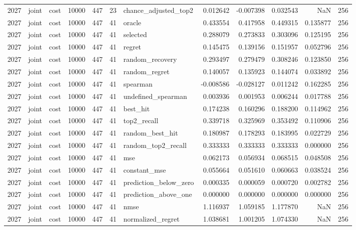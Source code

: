 \begin{tabular}{rllrrrlrrrrr}
2027 & joint & cost & 10000 & 447 & 23 & chance_adjusted_top2 & 0.012642 & -0.007398 & 0.032543 & NaN & 256 \\
2027 & joint & cost & 10000 & 447 & 41 & oracle & 0.433554 & 0.417958 & 0.449315 & 0.135877 & 256 \\
2027 & joint & cost & 10000 & 447 & 41 & selected & 0.288079 & 0.273833 & 0.303096 & 0.125195 & 256 \\
2027 & joint & cost & 10000 & 447 & 41 & regret & 0.145475 & 0.139156 & 0.151957 & 0.052796 & 256 \\
2027 & joint & cost & 10000 & 447 & 41 & random_recovery & 0.293497 & 0.279479 & 0.308246 & 0.123850 & 256 \\
2027 & joint & cost & 10000 & 447 & 41 & random_regret & 0.140057 & 0.135923 & 0.144074 & 0.033892 & 256 \\
2027 & joint & cost & 10000 & 447 & 41 & spearman & -0.008586 & -0.028127 & 0.011242 & 0.162285 & 256 \\
2027 & joint & cost & 10000 & 447 & 41 & undefined_spearman & 0.003936 & 0.001953 & 0.006244 & 0.017788 & 256 \\
2027 & joint & cost & 10000 & 447 & 41 & best_hit & 0.174238 & 0.160296 & 0.188200 & 0.114962 & 256 \\
2027 & joint & cost & 10000 & 447 & 41 & top2_recall & 0.339718 & 0.325969 & 0.353492 & 0.110906 & 256 \\
2027 & joint & cost & 10000 & 447 & 41 & random_best_hit & 0.180987 & 0.178293 & 0.183995 & 0.022729 & 256 \\
2027 & joint & cost & 10000 & 447 & 41 & random_top2_recall & 0.333333 & 0.333333 & 0.333333 & 0.000000 & 256 \\
2027 & joint & cost & 10000 & 447 & 41 & mse & 0.062173 & 0.056934 & 0.068515 & 0.048508 & 256 \\
2027 & joint & cost & 10000 & 447 & 41 & constant_mse & 0.055664 & 0.051610 & 0.060663 & 0.038524 & 256 \\
2027 & joint & cost & 10000 & 447 & 41 & prediction_below_zero & 0.000335 & 0.000059 & 0.000720 & 0.002782 & 256 \\
2027 & joint & cost & 10000 & 447 & 41 & prediction_above_one & 0.000000 & 0.000000 & 0.000000 & 0.000000 & 256 \\
2027 & joint & cost & 10000 & 447 & 41 & nmse & 1.116937 & 1.059185 & 1.177870 & NaN & 256 \\
2027 & joint & cost & 10000 & 447 & 41 & normalized_regret & 1.038681 & 1.001205 & 1.074330 & NaN & 256 \\

\end{tabular}
